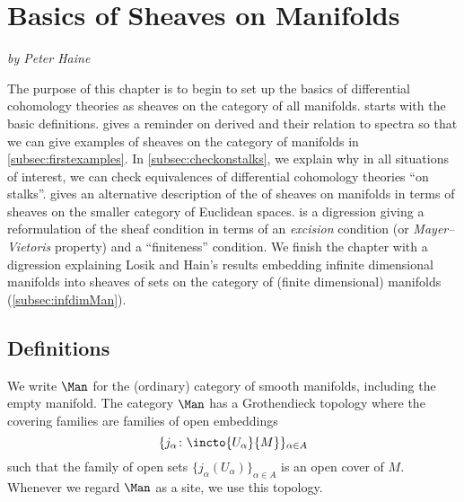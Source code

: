 
\section{Basics of Sheaves on Manifolds}\label{sec:sheavesonMan}\label{sec:basicsetup}
\textit{by Peter Haine}

The purpose of this chapter is to begin to set up the basics of differential cohomology theories as sheaves on the category of all manifolds.
 starts with the basic definitions.
 gives a reminder on derived \categories and their relation to spectra so that we can give examples of sheaves on the category of manifolds in \cref{subsec:firstexamples}.
In \cref{subsec:checkonstalks}, we explain why in all situations of interest, we can check equivalences of
differential cohomology theories ``on stalks''.
 gives an alternative description of the \category of sheaves on manifolds in terms of sheaves on the smaller category of Euclidean spaces.
 is a digression giving a reformulation of the sheaf condition in terms of an
\textit{excision} condition (or \textit{Mayer--Vietoris} property) and a ``finiteness'' condition.
We finish the chapter with a digression explaining Losik and Hain's results embedding infinite dimensional manifolds into sheaves of sets on the category of (finite dimensional) manifolds (\cref{subsec:infdimMan}).


\subsection{Definitions}\label{subsec:ShManDef}

\begin{notation}
	We write $ \Man $ for the (ordinary) category of smooth manifolds, including the empty manifold.
	The category $ \Man $ has a Grothendieck topology where the covering families are families of open embeddings
	\begin{equation*}
		\{ j_{\alpha} \colon \incto{U_{\alpha}}{M} \}_{\alpha \in A}
	\end{equation*}
	such that the family of open sets $ \{j_{\alpha}(U_{\alpha})\}_{\alpha \in A} $ is an open cover of $ M $. 
	Whenever we regard $ \Man $ as a site, we use this topology.
\end{notation}

